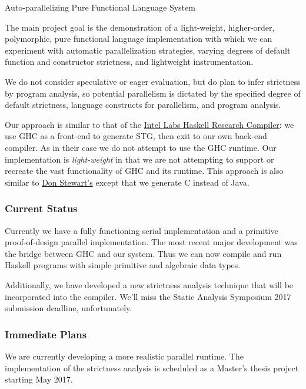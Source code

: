 \begin{hcarentry}[updated]{Auto-parallelizing Pure Functional Language System}
\makeheader

The main project goal is the demonstration of a light-weight, higher-order,
polymorphic, pure functional language implementation with which we can
experiment with automatic parallelization strategies, varying degrees of
default function and constructor strictness, and lightweight instrumentation.

We do not consider speculative or eager evaluation, but do plan to infer
strictness by program analysis, so potential parallelism is dictated by the
specified degree of default strictness, language constructs for parallelism,
and program analysis.

Our approach is similar to that of the
\href{https://dl.acm.org/citation.cfm?id=2503779}{Intel Labs Haskell
Research Compiler}: we use GHC as a front-end to generate STG, then
exit to our own back-end compiler.  As in their case we do not attempt to use
the GHC runtime.  Our implementation is \emph{light-weight} in that we are not
attempting to support or recreate the vast functionality of GHC and its
runtime.  This approach is also similar to
\href{http://www.cse.unsw.edu.au/~pls/thesis/dons-thesis.ps.gz}{Don Stewart's}
except that we generate C instead of Java.

\subsubsection*{Current Status}
Currently we have a fully functioning serial implementation and a primitive
proof-of-design parallel implementation. The most recent major development
was the bridge between GHC and our system. Thus we can now compile and run
Haskell programs with simple primitive and algebraic data types.

Additionally, we have developed a new strictness analysis technique that will
be incorporated into the compiler.  We'll miss the Static Analysis Symposium
2017 submission deadline, unfortunately.

\subsubsection*{Immediate Plans}

We are currently developing a more realistic parallel runtime.
The implementation of the strictness analysis is scheduled as a Master's thesis project
starting May 2017.


\end{hcarentry}
